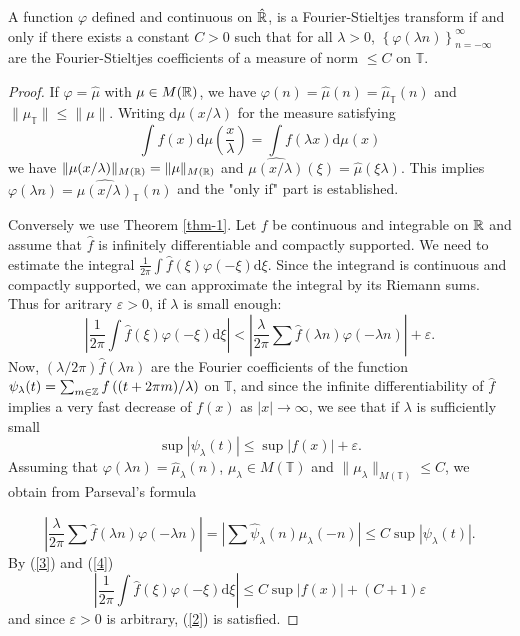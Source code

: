 \begin{theorem}\label{thm-2}
 A function $\varphi$ defined and continuous on $\hat{\mathbb{R}}$, is a Fourier-Stieltjes transform if and only if there exists a constant $C>0$ such that for all $\lambda>0$, $\left\{\varphi(\lambda n)\right\} _{n=-\infty}^{\infty}$ are the Fourier-Stieltjes coefficients of a measure of norm $\le C$ on $\mathbb{T}$.
\end{theorem}
\begin{proof}
  If $\varphi=\hat{\mu}$ with $\mu \in M(\mathbb{R})$, we have $\varphi(n)=\hat{\mu}(n)=\hat{\mu}_{\mathbb{T}}(n)$ and $\|\mu_{\mathbb{T}}\|\le \|\mu\|$. Writing $\mathrm{d}\mu (x /\lambda)$ for the measure satisfying
  \[
    \int f(x)\mathrm{d}\mu \left( \frac{x}{\lambda} \right) =\int f(\lambda x)\mathrm{d}\mu(x)
  \]
  we have $\|\mu(x /\lambda)\|_{M(\mathbb{R})}=\|\mu\|_{M(\mathbb{R})}$ and $\widehat{\mu\left( x /\lambda \right) }(\xi)=\hat{\mu}(\xi \lambda)$. This implies $\varphi(\lambda n)=\widehat{\mu(x / \lambda)}_{\mathbb{T}}(n)$ and the "only if" part is established.

  Conversely we use Theorem \ref{thm-1}. Let $f$ be continuous and integrable on $\mathbb{R}$ and assume that $\hat{f}$ is infinitely differentiable and compactly supported. We need to estimate the integral $\frac{1}{2\pi}\int \hat{f}(\xi)\varphi(-\xi)\mathrm{d}\xi$. Since the integrand is continuous and compactly supported, we can approximate the integral by its Riemann sums. Thus for aritrary $\varepsilon >0$, if $\lambda$ is small enough:
  \begin{equation}
    \left| \frac{1}{2\pi}\int \hat{f}(\xi)\varphi(-\xi)\mathrm{d}\xi \right| <\left| \frac{\lambda}{2\pi}\sum_{}^{} \hat{f}(\lambda n)\varphi(-\lambda n) \right| +\varepsilon .\label{3}
  \end{equation}
  Now, $(\lambda / 2\pi )\hat{f}(\lambda n)$ are the Fourier coefficients of the function
$\psi_{\lambda}(t)=\sum_{m \in \mathbb{Z}}^{}f\left( (t+2\pi m) /\lambda \right)  $ on $\mathbb{T}$, and since the infinite differentiability of $\hat{f}$ implies a very fast decrease of $f(x)$ as $|x|\to \infty$, we see that if $\lambda$ is sufficiently small
\begin{equation}
  \sup |\psi_{\lambda}(t)|\le \sup|f(x)|+\varepsilon.\label{4}
\end{equation}
Assuming that $\varphi(\lambda n)=\hat{\mu}_{\lambda}(n)$, $\mu_{\lambda}\in M(\mathbb{T})$ and $\|\mu_\lambda\|_{M(\mathbb{T})}\le C$, we obtain from Parseval's formula

\[
  \left| \frac{\lambda}{2\pi}\sum \hat{f}(\lambda n)\varphi(-\lambda n) \right| =\left| \sum \hat{\psi}_\lambda (n) \hat{\mu}_{\lambda}(-n) \right| \le C \sup |\psi_\lambda(t)|.
\] 
By (\ref{3}) and (\ref{4})
\[
  \left| \frac{1}{2\pi}\int \hat{f}(\xi)\varphi(-\xi)\mathrm{d}\xi \right| \le C\sup |f(x)|+(C+1)\varepsilon 
\] and since $\varepsilon >0$ is arbitrary, (\ref{2}) is satisfied.

\end{proof}

